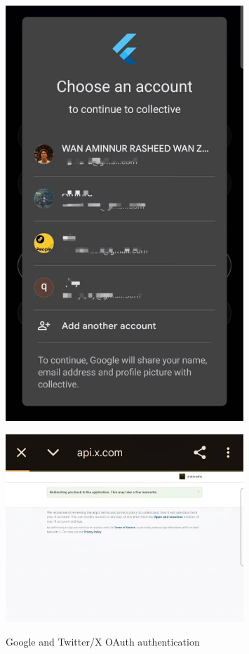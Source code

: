 \begin{figure}[H]
\centering
\begin{minipage}{0.4\textwidth}
\centering
\includegraphics[width=0.8\textwidth]{files/imgs/prototype/google_oauth.jpeg}
\caption{Google and Twitter/X OAuth authentication}
\label{fig:google-oauth}
\end{minipage}
\hfill
\begin{minipage}{0.4\textwidth}
\centering
\includegraphics[width=0.8\textwidth]{files/imgs/prototype/x_oauth.jpeg}
\label{fig:twitter-oauth}
\end{minipage}
\end{figure}

